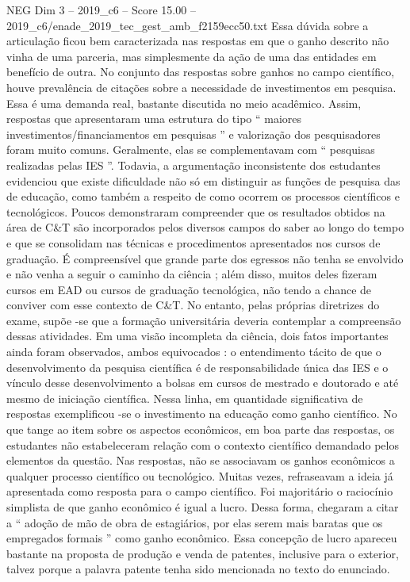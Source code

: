 \begin{textsample}{NEG Dim 3 – 2019\_c6 – Score 15.00 – 2019\_c6/enade\_2019\_tec\_gest\_amb\_f2159ecc50.txt}
Essa dúvida sobre a articulação ficou bem caracterizada nas respostas em que o ganho descrito não vinha de uma parceria, mas simplesmente da ação de uma das entidades em benefício de outra.
No conjunto das respostas sobre ganhos no campo científico, houve prevalência de citações sobre a necessidade de investimentos em pesquisa.
Essa é uma demanda real, bastante discutida no meio acadêmico.
Assim, respostas que apresentaram uma estrutura do tipo “ maiores investimentos/financiamentos em pesquisas ” e valorização dos pesquisadores foram muito comuns.
Geralmente, elas se complementavam com “ pesquisas realizadas pelas IES ”.
Todavia, a argumentação inconsistente dos estudantes evidenciou que existe dificuldade não só em distinguir as funções de pesquisa das de educação, como também a respeito de como ocorrem os processos científicos e tecnológicos.
Poucos demonstraram compreender que os resultados obtidos na área de C\&T são incorporados pelos diversos campos do saber ao longo do tempo e que se consolidam nas técnicas e procedimentos apresentados nos cursos de graduação.
É compreensível que grande parte dos egressos não tenha se envolvido e não venha a seguir o caminho da ciência ; além disso, muitos deles fizeram cursos em EAD ou cursos de graduação tecnológica, não tendo a chance de conviver com esse contexto de C\&T.
No entanto, pelas próprias diretrizes do exame, supõe -se que a formação universitária deveria contemplar a compreensão dessas atividades.
Em uma visão incompleta da ciência, dois fatos importantes ainda foram observados, ambos equivocados : o entendimento tácito de que o desenvolvimento da pesquisa científica é de responsabilidade única das IES e o vínculo desse desenvolvimento a bolsas em cursos de mestrado e doutorado e até mesmo de iniciação científica.
Nessa linha, em quantidade significativa de respostas exemplificou -se o investimento na educação como ganho científico.
No que tange ao item sobre os aspectos econômicos, em boa parte das respostas, os estudantes não estabeleceram relação com o contexto científico demandado pelos elementos da questão.
Nas respostas, não se associavam os ganhos econômicos a qualquer processo científico ou tecnológico.
Muitas vezes, refraseavam a ideia já apresentada como resposta para o campo científico.
Foi majoritário o raciocínio simplista de que ganho econômico é igual a lucro.
Dessa forma, chegaram a citar a “ adoção de mão de obra de estagiários, por elas serem mais baratas que os empregados formais ” como ganho econômico.
Essa concepção de lucro apareceu bastante na proposta de produção e venda de patentes, inclusive para o exterior, talvez porque a palavra patente tenha sido mencionada no texto do enunciado.

\end{textsample}
